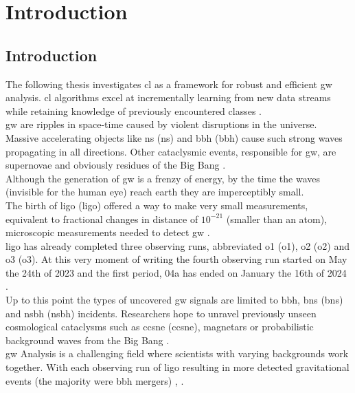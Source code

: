 \chapter{Introduction}
\label{ch:1}
\section{Introduction}
\label{sec-Introduction}
The following thesis investigates \acrlong{cl} as a framework for robust and efficient \acrlong{gw} analysis. \acrshort{cl} algorithms excel at incrementally learning from new data streams while retaining knowledge of previously encountered classes \citep{van2022three, qu2021recent, de2021continual}.\\
\acrshort{gw} are ripples in space-time caused by violent disruptions in the universe. Massive accelerating objects like \acrlong{ns} (\acrshort{ns}) and \acrlong{bbh} (\acrshort{bbh}) cause such strong waves propagating in all directions. Other cataclysmic events, responsible for \acrshort{gw}, are supernovae and obviously residues of the Big Bang \citep{CaltechWhatAreGW}. \\
Although the generation of \acrshort{gw} is a frenzy of energy, by the time the waves (invisible for the human eye) reach earth they are imperceptibly small.\\
The birth of \acrshort{ligo} (\acrlong{ligo}) offered a way to make very small measurements, equivalent to fractional changes in distance of $10^{-21}$ (smaller than an atom), microscopic measurements needed to detect \acrshort{gw} \citep{zevin2017gravity,glanzer2023data}. \\
\acrshort{ligo} has already completed three observing runs, abbreviated \acrshort{o1} (\acrlong{o1}), \acrshort{o2} (\acrlong{o2}) and \acrshort{o3} (\acrlong{o3}). At this very moment of writing the fourth observing run started on May the 24th of 2023 and the first period, 04a has ended on January the 16th of 2024 \citep{LIGORunPlan}. \\
Up to this point the types of uncovered \acrshort{gw} signals are limited to \acrshort{bbh}, \acrlong{bns} (\acrshort{bns}) and \acrlong{nsbh} (\acrshort{nsbh}) incidents. Researchers hope to unravel previously unseen cosmological cataclysms such as \acrshort{ccsne} (\acrlong{ccsne}), magnetars or probabilistic background waves from the Big Bang \citep{cuoco2020enhancing}. \\
\acrshort{gw} Analysis is a challenging field where scientists with varying backgrounds work together. With each observing run of \acrshort{ligo} resulting in more detected gravitational events (the majority were \acrshort{bbh} mergers) \citep{zevin2017gravity,glanzer2023data}, \citep{CaltechFAQ}. 

